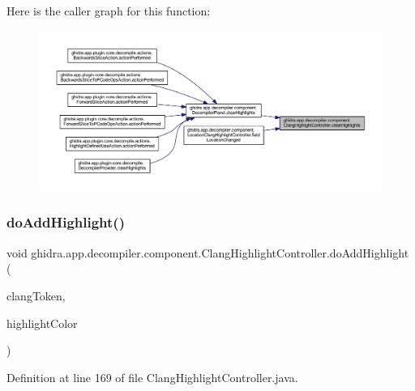 Here is the caller graph for this function\+:
\nopagebreak
\begin{figure}[H]
\begin{center}
\leavevmode
\includegraphics[width=350pt]{classghidra_1_1app_1_1decompiler_1_1component_1_1_clang_highlight_controller_a23d3b639418118f916813e02d99d8025_icgraph}
\end{center}
\end{figure}
\mbox{\label{classghidra_1_1app_1_1decompiler_1_1component_1_1_clang_highlight_controller_adcaa163e6517db404fb5aee28b20b08d}} 
\subsubsection{\texorpdfstring{doAddHighlight()}{doAddHighlight()}}
{\footnotesize\ttfamily void ghidra.\+app.\+decompiler.\+component.\+Clang\+Highlight\+Controller.\+do\+Add\+Highlight (\begin{DoxyParamCaption}\item[{\mbox{\hyperlink{classghidra_1_1app_1_1decompiler_1_1_clang_token}{Clang\+Token}}}]{clang\+Token,  }\item[{Color}]{highlight\+Color }\end{DoxyParamCaption})\hspace{0.3cm}{\ttfamily [inline]}}



Definition at line 169 of file Clang\+Highlight\+Controller.\+java.

